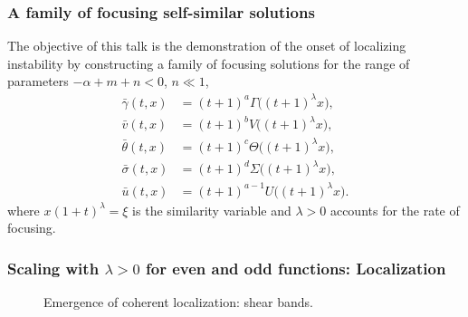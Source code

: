 \documentclass{beamer}
\def\red{\color{red}}
\def\blue{\color{blue}}
\def\bg{{\bar{\gamma}}}
\def\bv{{\bar{v}}}
\def\bth{{\bar{\theta}}}
\def\bs{{\bar{\sigma}}}
\def\bu{{\bar{u}}}
\begin{document}
\begin{frame}
 \frametitle{A family of focusing self-similar solutions}
   {The objective of this talk} is the demonstration of the onset of localizing instability by constructing {\blue a family of {\red focusing} solutions} for the range of parameters $-\alpha+m+n<0$, $n\ll1$,
\begin{equation} \label{intro-sols}
\begin{aligned}
 \bg(t,x) &= (t+1)^a\Gamma\big((t+1)^\lambda x\big), \\
 \bv(t,x) &= (t+1)^b V\big((t+1)^\lambda x\big), \\
 \bth(t,x) &= (t+1)^c\Theta\big((t+1)^\lambda x\big),\\
 \bs(t,x) &= (t+1)^d\Sigma\big((t+1)^\lambda x\big), \\
 \bu(t,x) &= (t+1)^{a-1}U\big((t+1)^\lambda x\big).
\end{aligned}
\end{equation}
where $x(1 + t)^{\lambda}=\xi$ is the similarity variable and $\lambda>0$ accounts for the rate of focusing.
\end{frame}




\begin{frame}
 \frametitle{Scaling with $\lambda>0$ for even and odd functions: Localization}
   \setcounter{subfigure}{0}
   \begin{figure}
	\quad \quad
   \caption{Emergence of coherent localization: shear bands.}
  \end{figure}
\end{frame}
\end{document}

